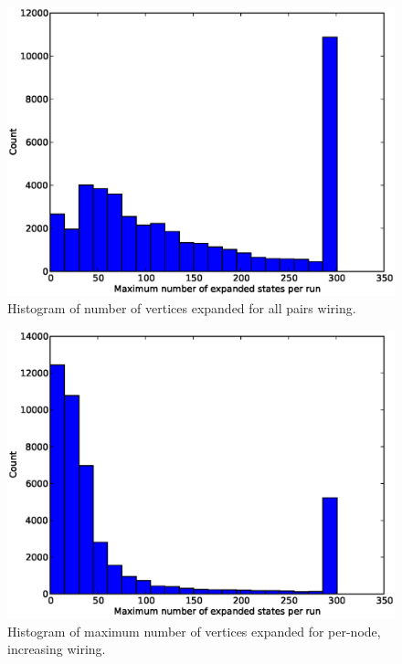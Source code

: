 \begin{figure}[H]
\begin{center}
\includegraphics[width=\textwidth]{Images/max_expanded_all_pairs.eps}
\caption{Histogram of number of vertices expanded for all pairs wiring.}
\label{fig:max_expanded_all_pairs}
\end{center}
\end{figure}

\begin{figure}[H]
\begin{center}
\includegraphics[width=\textwidth]{Images/max_expanded_per_node_increasing.eps}
\caption{Histogram of maximum number of vertices expanded for per-node,
increasing wiring.}
\label{fig:max_expanded_per_node_increasing}
\end{center}
\end{figure}

